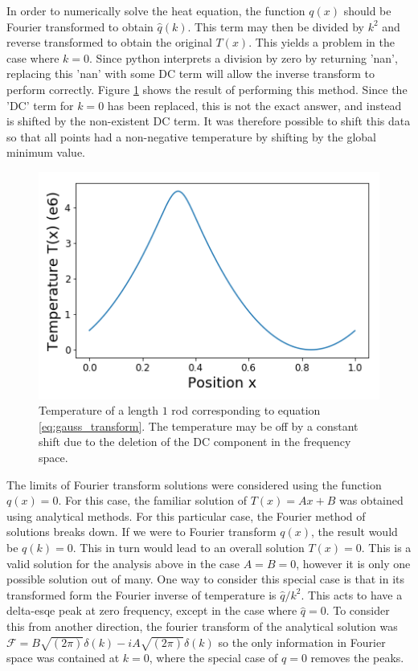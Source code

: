\documentclass[twocolumn]{article}
\begin{document}
In order to numerically solve the heat equation, the function $q(x)$ should be Fourier transformed to obtain $\hat{q}(k)$. This term may then be divided by $k^2$ and reverse transformed to obtain the original $T(x)$. This yields a problem in the case where $k=0$. Since python interprets a division by zero by returning 'nan', replacing this 'nan' with some DC term will allow the inverse transform to perform correctly. Figure \ref{fig:temp} shows the result of performing this method. Since the 'DC' term for $k=0$ has been replaced, this is not the exact answer, and instead is shifted by the non-existent DC term. It was therefore possible to shift this data so that all points had a non-negative temperature by shifting by the global minimum value. 

\begin{figure}
\centering
\includegraphics[width=\linewidth]{temp}
\caption{Temperature of a length $1$ rod corresponding to equation \ref{eq:gauss_transform}. The temperature may be off by a constant shift due to the deletion of the DC component in the frequency space.}
\label{fig:temp}
\end{figure}

The limits of Fourier transform solutions were considered using the function $q(x) = 0$. For this case, the familiar solution of $T(x) = Ax + B$ was obtained using analytical methods. For this particular case, the Fourier method of solutions breaks down. If we were to Fourier transform $q(x)$, the result would be $q(k)=0$. This in turn would lead to an overall solution $T(x) = 0$. This is a valid solution for the analysis above in the case $A=B=0$, however it is only one possible solution out of many. One way to consider this special case is that in its transformed form the Fourier inverse of temperature is $\hat{q}/k^2$. This acts to have a delta-esqe peak at zero frequency, except in the case where $\hat{q}=0$. To consider this from another direction, the fourier transform of the analytical solution was $\mathcal{F} = B\sqrt{(2\pi)}\delta (k) - iA\sqrt{(2\pi)}\delta(k)$ so the only information in Fourier space was contained at $k=0$, where the special case of $q=0$ removes the peaks.
\end{document}
